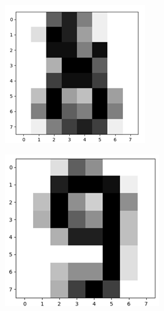 \documentclass[a4paper,12pt]{report}
\begin{document}
\begin{center}
\captionsetup{type=figure}
\begin{minipage}[c]{.45\linewidth}
    \centering
    \includegraphics[width=1\linewidth]{media/digit8.png}
\end{minipage}
\begin{minipage}[c]{.45\linewidth}
    \centering
    \includegraphics[width=1\linewidth]{media/digit9.png}
\end{minipage}
\end{center}
\end{document}
